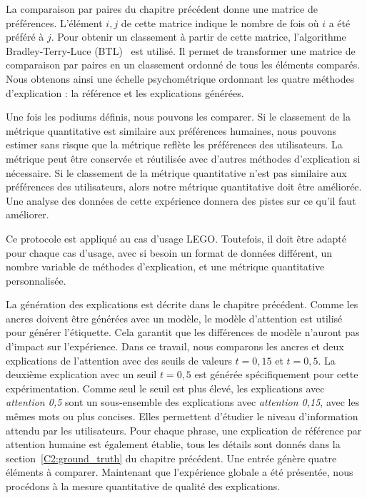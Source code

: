 La comparaison par paires du chapitre précédent donne une matrice de préférences. L'élément $i,j$ de cette matrice indique le nombre de fois où $i$ a été préféré à $j$. Pour obtenir un classement à partir de cette matrice, l'algorithme Bradley-Terry-Luce (BTL)~\cite{Bradley1952,Luce1959} est utilisé. Il permet de transformer une matrice de comparaison par paires en un classement ordonné de tous les éléments comparés. Nous obtenons ainsi une échelle psychométrique ordonnant les quatre méthodes d'explication : la référence et les explications générées.

Une fois les podiums définis, nous pouvons les comparer. Si le classement de la métrique quantitative est similaire aux préférences humaines, nous pouvons estimer sans risque que la métrique reflète les préférences des utilisateurs. La métrique peut être conservée et réutilisée avec d'autres méthodes d'explication si nécessaire.
Si le classement de la métrique quantitative n'est pas similaire aux préférences des utilisateurs, alors notre métrique quantitative doit être améliorée. Une analyse des données de cette expérience donnera des pistes sur ce qu'il faut améliorer.

Ce protocole est appliqué au cas d'usage LEGO. Toutefois, il doit être adapté pour chaque cas d'usage, avec si besoin un format de données différent, un nombre variable de méthodes d'explication, et une métrique quantitative personnalisée.


La génération des explications est décrite dans le chapitre précédent. Comme les ancres doivent être générées avec un modèle, le modèle d'attention est utilisé pour générer l'étiquette. Cela garantit que les différences de modèle n'auront pas d'impact sur l'expérience. Dans ce travail, nous comparons les ancres et deux explications de l'attention avec des seuils de valeurs $t = 0,15$ et $t = 0,5$. La deuxième explication avec un seuil $t = 0,5$ est générée spécifiquement pour cette expérimentation. Comme seul le seuil est plus élevé, les explications avec \textit{attention 0,5} sont un sous-ensemble des explications avec \textit{attention 0,15}, avec les mêmes mots ou plus concises. Elles permettent d'étudier le niveau d'information attendu par les utilisateurs. Pour chaque phrase, une explication de référence par attention humaine est également établie, tous les détails sont donnés dans la section~\ref{C2:ground_truth} du chapitre précédent. Une entrée génère quatre éléments à comparer.
Maintenant que l'expérience globale a été présentée, nous procédons à la mesure quantitative de qualité des explications.

